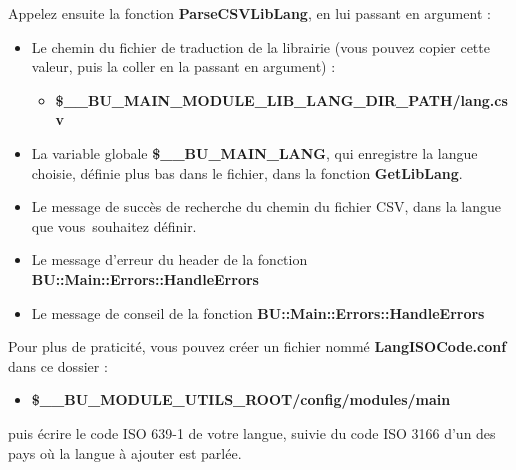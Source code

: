 \documentclass[a4paper,10pt]{article}
\begin{document}
\begin{justify}
    Appelez ensuite la fonction \textbf{\color{mauve}ParseCSVLibLang}, en lui passant en argument :

    \begin{itemize}
        \item Le chemin du fichier de traduction de la librairie (vous pouvez copier cette valeur, puis la coller en la passant en argument) :
        \begin{itemize}
            \item \textbf{\color{orange}\$\_\_BU\_MAIN\_MODULE\_LIB\_LANG\_DIR\_PATH\color{lime}/lang.csv}\\
        \end{itemize}

        \item La variable globale \textbf{\color{orange}\$\_\_BU\_MAIN\_LANG}, qui enregistre la langue choisie, définie plus bas dans le fichier, dans la fonction \textbf{\color{mauve}GetLibLang}.\\

        \item Le message de succès de recherche du chemin du fichier CSV, dans la langue que vous\ souhaitez définir.\\

        \item Le message d'erreur du header de la fonction \textbf{\color{mauve}BU::Main::Errors::HandleErrors}\\

        \item Le message de conseil de la fonction \textbf{\color{mauve}BU::Main::Errors::HandleErrors}
    \end{itemize}
\end{justify}

\begin{justify}
    Pour plus de praticité, vous pouvez créer un fichier nommé \textbf{\color{lime}LangISOCode.conf} dans ce dossier :
    
    \begin{itemize}
        \item \textbf{\color{orange}\$\_\_BU\_MODULE\_UTILS\_ROOT\color{lime}/config/modules/main}
    \end{itemize}
\end{justify}

\begin{justify}
    puis écrire le code ISO 639-1 de votre langue, suivie du code ISO 3166 d'un des pays où la langue à ajouter est parlée.
\end{justify}
\end{document}
